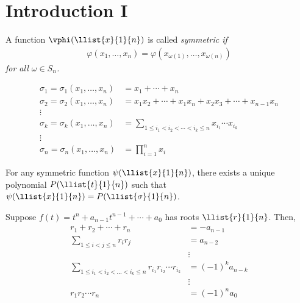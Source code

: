 \documentclass[a4paper]{article}
\begin{document}
\section{Introduction I}
\begin{tdefinition}
  A function \( \vphi(\llist{x}{1}{n}) \) is called \it{symmetric} if \begin{align*}
    \varphi(x_1,\ldots,x_n) = \varphi(x_{\omega(1)},\ldots,x_{\omega(n)})
  \end{align*}
  for all \( \omega\in S_n \).
\end{tdefinition}

\begin{tdefinition}
  \begin{align*}
    \sigma_1 = \sigma_1(x_1,\ldots,x_n) &= x_1+\cdots+x_n \\
    \sigma_2 = \sigma_2(x_1,\ldots,x_n) &= x_1x_2+\cdots+x_1x_n+x_2x_3+\cdots+x_{n-1}x_n \\
    \vdots \\
    \sigma_k = \sigma_k(x_1,\ldots,x_n)&=\sum\limits_{1\leq i_1<i_2<\cdots<i_k\leq n}x_{i_1}\cdots x_{i_k} \\
    \vdots \\
    \sigma_n = \sigma_n(x_1,\ldots,x_n)&=\prod\limits_{i=1}^n x_i
  \end{align*}
\end{tdefinition}

\begin{ttheorem}
  For any symmetric function \( \psi(\llist{x}{1}{n}) \), there exists a unique polynomial \( P(\llist{t}{1}{n}) \) such that \( \psi(\llist{x}{1}{n}) = P(\llist{\sigma}{1}{n}) \).
\end{ttheorem}

\begin{tdefinition}
Suppose \( f(t) = t^{n} + a_{n-1} t^{n-1} + \cdots + a_{0} \) has roots \( \llist{r}{1}{n} \).
Then,
  \begin{align*}
  r_1 + r_2 + \cdots + r_n &= -a_{n-1} \\
  \sum_{1 \le i < j \le n} r_i r_j &= a_{n-2} \\
  &\vdots \\
  \sum_{1 \le i_1 < i_2 < \dots < i_k \le n} r_{i_{1}}r_{i_{2}}\cdots r_{i_{k}} &= (-1)^k a_{n-k} \\
  &\vdots \\
  r_1 r_2 \cdots r_n &= (-1)^n a_0
  \end{align*}
\end{tdefinition}
\end{document}

